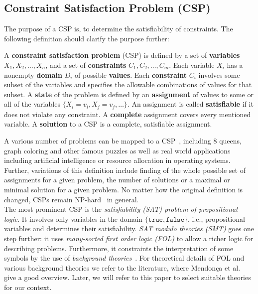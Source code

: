 \subsection{Constraint Satisfaction Problem (CSP)}\label{subsec:csp}

The purpose of a CSP is, to determine the satisfiability of constraints. The following definition should clarify the purpose further:

\begin{definition}\cite{csp}
A \textbf{constraint satisfaction problem} (CSP) is defined by a set of \textbf{variables} $X_1, X_2, \ldots, X_n$, and a set of \textbf{constraints} $C_1, C_2, \ldots, C_m$. Each variable $X_i$ has a nonempty \textbf{domain} $D_i$ of possible \textbf{values}. Each \textbf{constraint} $C_i$ involves some subset of the variables and specifies the allowable combinations of values for that subset. A \textbf{state} of the problem is defined by an \textbf{assignment} of values to some or all of the variables $\{X_i = v_i, X_j = v_j, \ldots\}$. An assignment is called \textbf{satisfiable} if it does not violate any constraint. A \textbf{complete} assignment covers every mentioned variable. A \textbf{solution} to a CSP is a complete, satisfiable assignment.
\end{definition}

A various number of problems can be mapped to a CSP~\cite{csp}, including 8 queens, graph coloring and other famous puzzles as well as real world applications including artificial intelligence or resource allocation in operating systems. Further, variations of this definition include finding of the whole possible set of assignments for a given problem, the number of solutions or a maximal or minimal solution for a given problem. No matter how the original definition is changed, CSPs remain NP-hard~\cite{csp} in general.\\



The most prominent CSP is the \emph{satisfiability (SAT) problem of propositional logic}. It involves only variables in the domain $\{\mathtt{true}, \mathtt{false}\}$, i.e., propositional variables and determines their satisfiability. \emph{SAT modulo theories (SMT)} goes one step further: it uses \emph{many-sorted first order logic (FOL)} to allow a richer logic for describing problems. Furthermore, it constraints the interpretation of some symbols by the use of \emph{background theories}~\cite{smt-appetizer}. For theoretical details of FOL and various background theories we refer to the literature, where Mendon\c{c}a et al.~\cite{smt-appetizer} give a good overview. Later, we will refer to this paper to select suitable theories for our context.\\

